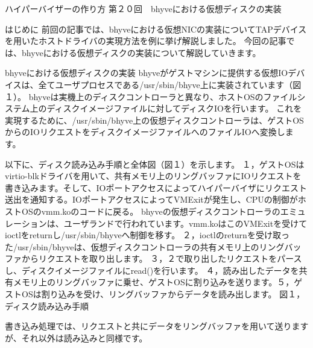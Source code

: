 ハイパーバイザーの作り方
第２０回　bhyveにおける仮想ディスクの実装

はじめに
前回の記事では、bhyveにおける仮想NICの実装についてTAPデバイスを用いたホストドライバの実現方法を例に挙げ解説しました。
今回の記事では、bhyveにおける仮想ディスクの実装について解説していきます。

bhyveにおける仮想ディスクの実装
bhyveがゲストマシンに提供する仮想IOデバイスは、全てユーザプロセスである/usr/sbin/bhyve上に実装されています（図１）。
bhyveは実機上のディスクコントローラと異なり、ホストOSのファイルシステム上のディスクイメージファイルに対してディスクIOを行います。
これを実現するために、/usr/sbin/bhyve上の仮想ディスクコントローラは、ゲストOSからのIOリクエストをディスクイメージファイルへのファイルIOへ変換します。

以下に、ディスク読み込み手順と全体図（図１）を示します。
１，ゲストOSはvirtio-blkドライバを用いて、共有メモリ上のリングバッファにIOリクエストを書き込みます。そして、IOポートアクセスによってハイパーバイザにリクエスト送出を通知する。IOポートアクセスによってVMExitが発生し、CPUの制御がホストOSのvmm.koのコードに戻る。
bhyveの仮想ディスクコントローラのエミュレーションは、ユーザランドで行われています。vmm.koはこのVMExitを受けてioctlをreturnし/usr/sbin/bhyveへ制御を移す。
２，ioctlのreturnを受け取った/usr/sbin/bhyveは、仮想ディスクコントローラの共有メモリ上のリングバッファからリクエストを取り出します。
３，２で取り出したリクエストをパースし、ディスクイメージファイルにread()を行います。
４，読み出したデータを共有メモリ上のリングバッファに乗せ、ゲストOSに割り込みを送ります。５，ゲストOSは割り込みを受け、リングバッファからデータを読み出します。
図１，ディスク読み込み手順


書き込み処理では、リクエストと共にデータをリングバッファを用いて送りますが、それ以外は読み込みと同様です。


